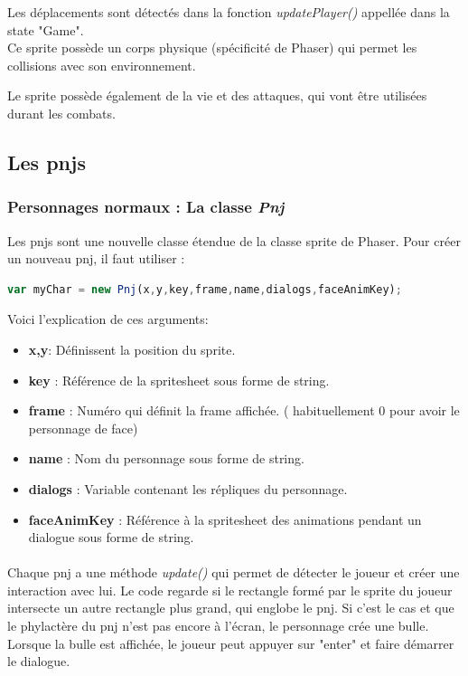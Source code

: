 \documentclass[11pt]{article}
\begin{document}
Les déplacements sont détectés dans la fonction \textit{updatePlayer()} appellée dans la state "Game".\\


Ce sprite possède un corps physique (spécificité de Phaser) qui permet les collisions avec son environnement.


Le sprite possède également de la vie et des attaques, qui vont être utilisées durant les combats. 
\subsection{Les pnjs}
\subsubsection{Personnages normaux : La classe \textit{Pnj}}
Les pnjs sont une nouvelle classe étendue de la classe sprite de Phaser. Pour créer un nouveau pnj, il faut utiliser :\\
 \begin{lstlisting}[language=JavaScript]
var myChar = new Pnj(x,y,key,frame,name,dialogs,faceAnimKey);
\end{lstlisting}
Voici l'explication de ces arguments:
\begin{itemize}
\item \textbf{x,y}: Définissent la position du sprite.
\item \textbf{key} : Référence de la spritesheet sous forme de string.
\item \textbf{frame} : Numéro qui définit la frame affichée. ( habituellement 0 pour avoir le personnage de face) 
\item \textbf{name} : Nom du personnage sous forme de string.
\item \textbf{dialogs} : Variable contenant les répliques du personnage.
\item \textbf{faceAnimKey} : Référence à la spritesheet des animations pendant un dialogue sous forme de string.
\end{itemize}
\paragraph{}

Chaque pnj a une méthode \textit{update()} qui permet de détecter le joueur et créer une interaction avec lui. Le code regarde si le rectangle formé par le sprite du joueur intersecte un autre rectangle plus grand, qui englobe le pnj. Si c'est le cas et que le phylactère du pnj n'est pas encore à l'écran, le personnage crée une bulle. Lorsque la bulle est affichée, le joueur peut appuyer sur "enter" et faire démarrer le dialogue.\\
\end{document}
